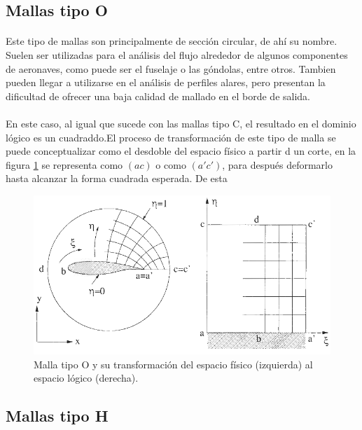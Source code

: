 \documentclass[letterpaper, openright, 12pt]{book}
\begin{document}
		\subsection{Mallas tipo O}
			\paragraph*{}
				Este tipo de mallas son principalmente de sección circular, de ahí su nombre. Suelen ser utilizadas para el análisis del flujo alrededor de algunos componentes de aeronaves, como puede ser el fuselaje o las góndolas, entre otros.\cite{vladimir-grid} Tambien pueden llegar a utilizarse en el análisis de perfiles alares, pero presentan la dificultad de ofrecer una baja calidad de mallado en el borde de salida.\cite{blazek}\cite{best-practices-grid-generation}
			\paragraph*{}
				En este caso, al igual que sucede con las mallas tipo C, el resultado en el dominio lógico es un cuadraddo.El proceso de transformación de este tipo de malla se puede conceptualizar como el desdoble del espacio físico a partir d un corte, en la figura \ref{fig:malla-o} se representa como $(ac)$ o como $(a'c')$, para después deformarlo hasta alcanzar la forma cuadrada esperada. De esta 
			\begin{figure}[htbp!]
				\centering
				\includegraphics[width=170mm]{./Imagenes/malla-o}
				\captionsetup{justification=centering, margin=2cm}
				\caption[Malla tipo O]{Malla tipo O y su transformación del espacio físico (izquierda) al espacio lógico (derecha). \cite{blazek}}
				\label{fig:malla-o}
			\end{figure}
		\subsection{Mallas tipo H}
\end{document}
